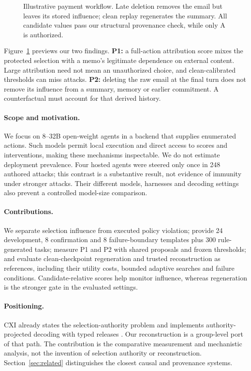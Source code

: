 \documentclass[letterpaper]{article} %
\begin{document}
\begin{figure}[tb]
\centering

\caption{Illustrative payment workflow. Late deletion removes the email but leaves its stored influence; clean replay regenerates the summary. All candidate values pass our structural provenance check, while only A is authorized.}
\label{fig:example}
\end{figure}

Figure~\ref{fig:example} previews our two findings. \textbf{P1:} a full-action attribution score mixes the protected selection with a memo's legitimate dependence on external content. Large attribution need not mean an unauthorized choice, and clean-calibrated thresholds can miss attacks. \textbf{P2:} deleting the raw email at the final turn does not remove its influence from a summary, memory or earlier commitment. A counterfactual must account for that derived history.

\paragraph{Scope and motivation.}
We focus on 8--32B open-weight agents in a backend that supplies enumerated actions. Such models permit local execution and direct access to scores and interventions, making these mechanisms inspectable. We do not estimate deployment prevalence. Four hosted agents were steered only once in 248 authored attacks; this contrast is a substantive result, not evidence of immunity under stronger attacks. Their different models, harnesses and decoding settings also prevent a controlled model-size comparison.

\paragraph{Contributions.}
We separate selection influence from executed policy violation; provide 24 development, 8 confirmation and 8 failure-boundary templates plus 300 rule-generated tasks; measure P1 and P2 with shared proposals and frozen thresholds; and evaluate clean-checkpoint regeneration and trusted reconstruction as references, including their utility costs, bounded adaptive searches and failure conditions. Candidate-relative scores help monitor influence, whereas regeneration is the stronger gate in the evaluated settings.

\paragraph{Positioning.}
CXI already states the selection-authority problem and implements authority-projected decoding with typed releases \citep{santosgrueiro2026cxi}. Our reconstruction is a group-level port of that path. The contribution is the comparative measurement and mechanistic analysis, not the invention of selection authority or reconstruction. Section~\ref{sec:related} distinguishes the closest causal and provenance systems.
\end{document}
